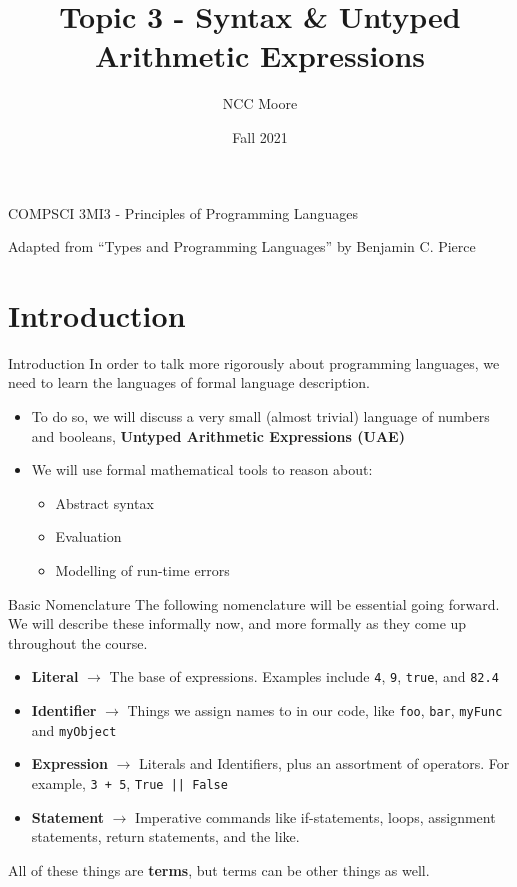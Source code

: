 \documentclass[11pt]{beamer}
\author{NCC Moore}
\title{Topic 3 - Syntax \& Untyped Arithmetic Expressions}
\institute{McMaster University}
\date{Fall 2021}
\begin{document}
\begin{frame}
\center
COMPSCI 3MI3 - Principles of Programming Languages
\titlepage

Adapted from ``Types and Programming Languages'' by Benjamin C. Pierce 
\end{frame}

\begin{frame}
\tableofcontents
\end{frame}

\section[Intro]{Introduction}
\begin{frame}[fragile=singleslide]{Introduction}
In order to talk more rigorously about programming languages, we need to learn the languages of formal language description.  
\begin{itemize}
\item To do so, we will discuss a very small (almost trivial) language of numbers and booleans, \textbf{Untyped Arithmetic Expressions (UAE)}  
\item We will use formal mathematical tools to reason about:
\begin{itemize}
\item Abstract syntax
\item Evaluation
\item Modelling of run-time errors
\end{itemize}
\end{itemize} 
\end{frame}

\begin{frame}[fragile=singleslide]{Basic Nomenclature}
The following nomenclature will be essential going forward.  We will describe these informally now, and more formally as they come up throughout the course.  
\begin{itemize}
\item \textbf{Literal} $\rightarrow$ The base of expressions.  Examples include \texttt{4}, \texttt{9}, \texttt{true}, and \texttt{82.4}  
\item \textbf{Identifier} $\rightarrow$ Things we assign names to in our code, like \texttt{foo}, \texttt{bar}, \texttt{myFunc} and \texttt{myObject}
\item \textbf{Expression} $\rightarrow$ Literals and Identifiers, plus an assortment of operators.  For example, \texttt{3 + 5}, \texttt{True || False}
\item \textbf{Statement} $\rightarrow$ Imperative commands like if-statements, loops, assignment statements, return statements, and the like.  
\end{itemize}
All of these things are \textbf{terms}, but terms can be other things as well.
\end{frame}
\end{document}
